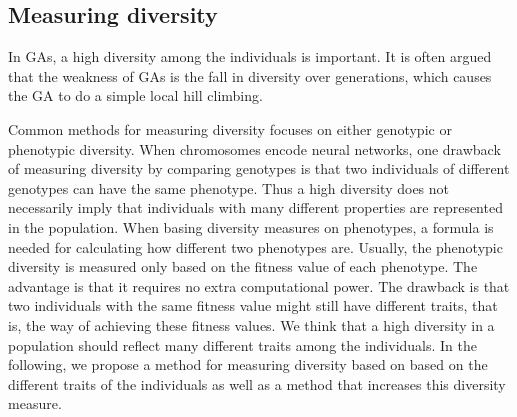 
\subsection{Measuring diversity}
In GAs, a high diversity among the individuals is important.
It is often argued that the weakness of GAs is the fall in diversity over generations, which causes the GA to do a simple local hill climbing.

Common methods for measuring diversity focuses on either genotypic or phenotypic diversity.
When chromosomes encode neural networks, one drawback of measuring diversity by comparing genotypes is that two individuals of different genotypes can have the same phenotype. Thus a high diversity does not necessarily imply that individuals with many different properties are represented in the population.
When basing diversity measures on phenotypes, a formula is needed for calculating how different two phenotypes are. 
Usually, the phenotypic diversity is measured only based on the fitness value of each phenotype.
The advantage is that it requires no extra computational power. 
The drawback is that two individuals with the same fitness value might still have different traits, that is, the way of achieving these fitness values. We think that a high diversity in a population should reflect many different traits among the individuals. In the following, we propose a method for measuring diversity based on based on the different traits of the individuals as well as a method that increases this diversity measure. 
